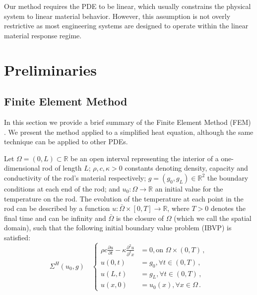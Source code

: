 \documentclass[letterpaper, 10 pt, conference]{ieeeconf/ieeeconf}
\newcommand*{\R}{\mathbb{R}}
\begin{document}
Our method requires the PDE to be linear, which usually constrains the
physical system to linear material behavior. However, this assumption is
not overly restrictive as most engineering systems are designed to operate
within the linear material response regime.

\section{Preliminaries}
\label{sec:preliminaries}

\subsection{Finite Element Method}
\label{sec:heat_equation_and_finite_element_analysis}

In this section we provide a brief summary of the Finite Element Method (FEM)
\cite{hughes_finite_2000}.
We present the method applied
to a simplified heat equation, although the same technique can be applied to other
PDEs. 

Let $\Omega = (0, L) \subset \R$ be an open interval representing the interior
of a one-dimensional rod of length $L$; $\rho, c, \kappa > 0$ 
constants denoting density, capacity and conductivity of the rod's material respectively;
$g = (g_0, g_L) \in \R^2$ the boundary conditions at each end of the rod; and $u_0 :
\Omega \rightarrow \R$ an initial value for the temperature on the rod. 
The evolution of the temperature at
each point in the rod can be described by a function $u : \bar \Omega \times [0,
T] \rightarrow \R$, where $T > 0$ denotes the final time and can be infinity and
$\bar \Omega$ is the closure of $\Omega$ (which we call the spatial domain),
such that the following initial boundary value problem (IBVP) is satisfied:
%
\begin{equation}\label{eq:pde}
    \Sigma^{H}(u_0, g) \quad \left \{
    \begin{aligned}
        \rho c \frac{\partial u}{\partial t} - \kappa \frac{\partial^2
        u}{\partial^2 x} &= 0, \text{on } \Omega \times (0, T) \,, \\
        u(0, t) &= g_0, \forall t \in (0, T) \,, \\
        u(L, t) &= g_L, \forall t \in (0, T) \,, \\
        u(x, 0) &= u_0(x), \forall x \in \Omega \,.
    \end{aligned}
    \right.
\end{equation}
\end{document}
